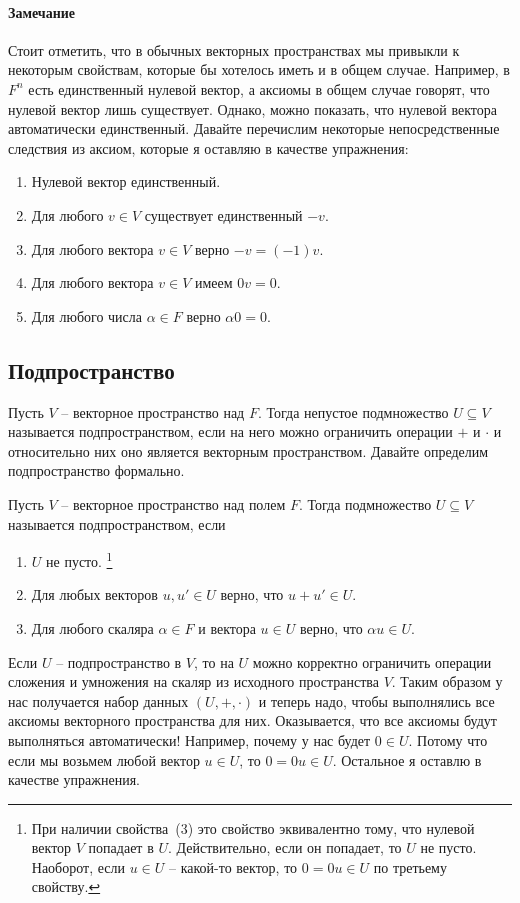 \paragraph{Замечание}
Стоит отметить, что в обычных векторных пространствах мы привыкли к некоторым свойствам, которые бы хотелось иметь и в общем случае.
Например, в $F^n$ есть единственный нулевой вектор, а аксиомы в общем случае говорят, что нулевой вектор лишь существует.
Однако, можно показать, что нулевой вектора автоматически единственный.
Давайте перечислим некоторые непосредственные следствия из аксиом, которые я оставляю в качестве упражнения:
\begin{enumerate}
\item Нулевой вектор единственный.

\item Для любого $v\in V$ существует единственный $-v$.

\item Для любого вектора $v\in V$ верно $-v = (-1)v$.

\item Для любого вектора $v\in V$ имеем $0 v = 0$.

\item Для любого числа $\alpha \in F$ верно $\alpha 0 = 0$.
\end{enumerate}

\subsection{Подпространство}

Пусть $V$ -- векторное пространство над $F$.
Тогда непустое подмножество $U\subseteq V$ называется подпространством, если на него можно ограничить операции $+$ и $\cdot$ и относительно них оно является векторным пространством.
Давайте определим подпространство формально.
\begin{definition}
Пусть $V$ -- векторное пространство над полем $F$.
Тогда подмножество $U\subseteq V$ называется подпространством, если
\begin{enumerate}
\item $U$ не пусто.%
\footnote{При наличии свойства~(3) это свойство эквивалентно тому, что нулевой вектор $V$ попадает в $U$.
Действительно, если он попадает, то $U$ не пусто.
Наоборот, если $u\in U$ -- какой-то вектор, то $0 = 0 u\in U$ по третьему свойству.}

\item Для любых векторов $u,u'\in U$ верно, что $u+u'\in U$.

\item Для любого скаляра $\alpha\in F$ и вектора $u\in U$ верно, что $\alpha u \in U$.
\end{enumerate}
\end{definition}
Если $U$ -- подпространство в $V$, то на $U$ можно корректно ограничить операции сложения и умножения на скаляр из исходного пространства $V$.
Таким образом у нас получается набор данных $(U, +, \cdot)$ и теперь надо, чтобы выполнялись все аксиомы векторного пространства для них.
Оказывается, что все аксиомы будут выполняться автоматически!
Например, почему у нас будет $0\in U$.
Потому что если мы возьмем любой вектор $u\in U$, то $0 = 0 u \in U$.
Остальное я оставлю в качестве упражнения.

